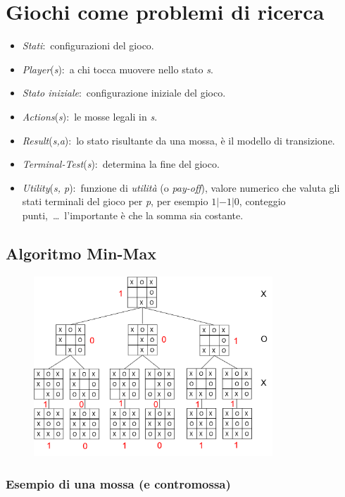 \section{Giochi come problemi di ricerca}

\begin{itemize}
	\item \textit{Stati}:\ configurazioni del gioco.
	\item \textit{Player}(\textit{s}):\ a chi tocca muovere nello stato \textit{s}.
	\item \textit{Stato iniziale}:\ configurazione iniziale del gioco.
	\item \textit{Actions}(\textit{s}):\ le mosse legali in \textit{s}.
	\item \textit{Result}(\textit{s,a}):\ lo stato risultante da una mossa, è il modello di transizione.
	\item \textit{Terminal-Test}(\textit{s}):\ determina la fine del gioco.
	\item \textit{Utility}(\textit{s, p}):\ funzione di \textit{utilità} (o \textit{pay-off}), valore numerico che valuta gli stati terminali del gioco per \textit{p}, per esempio $1|-1|0$, conteggio punti,\ \dots\ l'importante è che la somma sia costante.
\end{itemize}

\subsection{Algoritmo Min-Max}

\begin{figure}[H]
	\centering
	\includegraphics[width=0.8\textwidth]{immagini/TicTacToe_fine.png}
\end{figure}

\subsubsection{Esempio di una mossa (e contromossa)}

